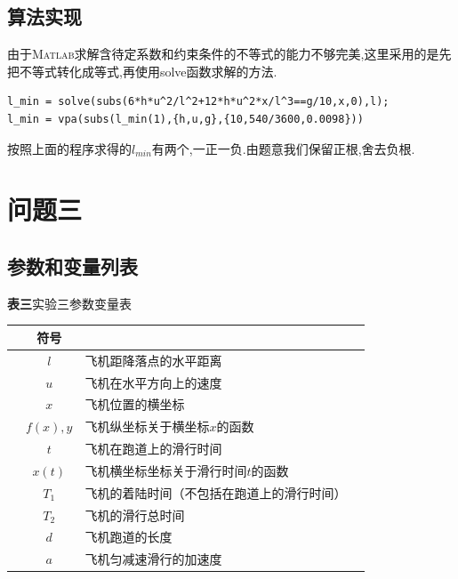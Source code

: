 \documentclass[a4paper,12pt]{article}
\begin{document}
\begin{CJK*}{UTF8}{gbsn}
\subsection{算法实现}
由于\textsc{Matlab}求解含待定系数和约束条件的不等式的能力不够完美,这里采用的是先把不等式转化成等式,再使用solve函数求解的方法.
\vspace{-11pt}
\begin{lstlisting}
l_min = solve(subs(6*h*u^2/l^2+12*h*u^2*x/l^3==g/10,x,0),l);
l_min = vpa(subs(l_min(1),{h,u,g},{10,540/3600,0.0098}))
\end{lstlisting}
\vspace{7pt}
\par 按照上面的程序求得的$l_{min}$有两个,一正一负.由题意我们保留正根,舍去负根.

\section{问题三}


\subsection{参数和变量列表}
\begin{center}
\textbf{表三}\quad 实验三参数变量表\\\vspace{2pt}
\begin{tabular}{cclc}
\toprule[1.5pt]
& 符号 & \qquad\qquad\qquad{} &\\
\midrule[1.5pt]
& $l$ & 飞机距降落点的水平距离 &\\
& $u$ & 飞机在水平方向上的速度 &\\
& $x$ & 飞机位置的横坐标 &\\
& $f(x),y$ & 飞机纵坐标关于横坐标$x$的函数 &\\
& $t$ & 飞机在跑道上的滑行时间 &\\
& $x(t)$ & 飞机横坐标坐标关于滑行时间$t$的函数 &\\
& $T_1$ & 飞机的着陆时间（不包括在跑道上的滑行时间） &\\
& $T_2$ & 飞机的滑行总时间 &\\
& $d$ & 飞机跑道的长度 &\\
& $a$ & 飞机匀减速滑行的加速度 &\\
\bottomrule[1.5pt]
\end{tabular}
\end{center}



\end{CJK*}
\end{document}
